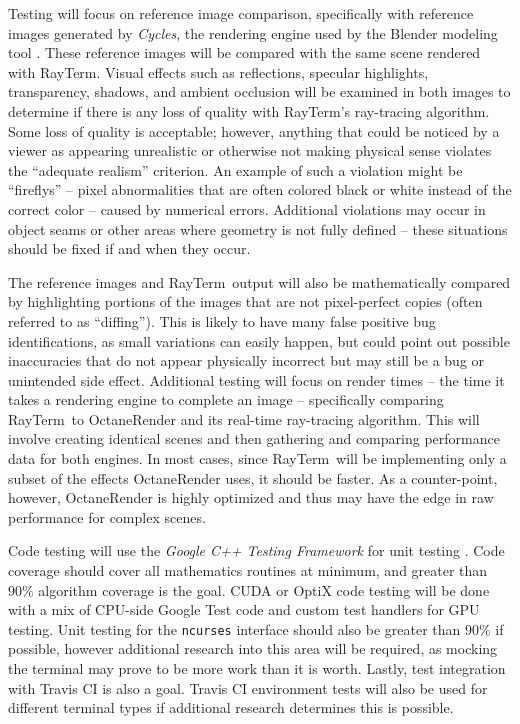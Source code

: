 \documentclass[11pt]{article}
\newcommand{\name}{{\sc RayTerm}}
\begin{document}
Testing will focus on reference image comparison, specifically with reference images generated by {\it Cycles}, the rendering engine used by the Blender modeling tool \cite{blender}.
These reference images will be compared with the same scene rendered with \name.
Visual effects such as reflections, specular highlights, transparency, shadows, and ambient occlusion will be examined in both images to determine if there is any loss of quality with \name's ray-tracing algorithm.
Some loss of quality is acceptable; however, anything that could be noticed by a viewer as appearing unrealistic or otherwise not making physical sense violates the ``adequate realism'' criterion.
An example of such a violation might be ``fireflys'' -- pixel abnormalities that are often colored black or white instead of the correct color -- caused by numerical errors.
Additional violations may occur in object seams or other areas where geometry is not fully defined -- these situations should be fixed if and when they occur.

The reference images and \name\ output will also be mathematically compared by highlighting portions of the images that are not pixel-perfect copies (often referred to as ``diffing'').
This is likely to have many false positive bug identifications, as small variations can easily happen, but could point out possible inaccuracies that do not appear physically incorrect but may still be a bug or unintended side effect.
Additional testing will focus on render times -- the time it takes a rendering engine to complete an image -- specifically comparing \name\ to OctaneRender \cite{octane} and its real-time ray-tracing algorithm.
This will involve creating identical scenes and then gathering and comparing performance data for both engines.
In most cases, since \name\ will be implementing only a subset of the effects OctaneRender uses, it should be faster.
As a counter-point, however, OctaneRender is highly optimized and thus may have the edge in raw performance for complex scenes.

Code testing will use the {\it Google C++ Testing Framework} for unit testing \cite{googletest}.
Code coverage should cover all mathematics routines at minimum, and greater than $90\%$ algorithm coverage is the goal.
CUDA or OptiX code testing will be done with a mix of CPU-side Google Test code and custom test handlers for GPU testing.
Unit testing for the \texttt{ncurses} interface should also be greater than $90\%$ if possible, however additional research into this area will be required, as mocking the terminal may prove to be more work than it is worth.
Lastly, test integration with Travis CI is also a goal.
Travis CI environment tests will also be used for different terminal types if additional research determines this is possible.
\end{document}
